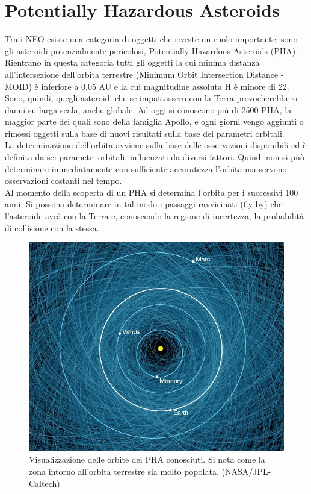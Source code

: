 \documentclass[a4paper,11pt,openright]{book}
\begin{document}
\section{Potentially Hazardous Asteroids}\label{sec:pha}
Tra i NEO esiste una categoria di oggetti che riveste un ruolo importante: sono gli asteroidi potenzialmente pericolosi, Potentially Hazardous Asteroids (PHA). Rientrano in questa categoria tutti gli oggetti la cui minima distanza all'intersezione dell'orbita terrestre (Minimum Orbit Intersection Distance - MOID) è inferiore a 0.05 AU e la cui magnitudine assoluta H è minore di 22. Sono, quindi, quegli asteroidi che se impattassero con la Terra provocherebbero danni su larga scala, anche globale. Ad oggi si conoscono più di 2500 PHA, la maggior parte dei quali sono della famiglia Apollo, e ogni giorni vengo aggiunti o rimossi oggetti sulla base di nuovi risultati sulla base dei parametri orbitali.\\
La determinazione dell'orbita avviene sulla base delle osservazioni disponibili ed è definita da sei parametri orbitali, influenzati da diversi fattori. Quindi non si può determinare immediatamente con sufficiente accuratezza l'orbita ma servono osservazioni costanti nel tempo.\\
Al momento della scoperta di un PHA si determina l'orbita per i successivi 100 anni. Si possono determinare in tal modo i passaggi ravvicinati (fly-by) che l'asteroide avrà con la Terra e, conoscendo la regione di incertezza, la probabilità di collisione con la stessa.

\begin{figure}
    \centering
    \includegraphics[scale=0.35]{figure/pha_map.jpg}
    \caption[Visualizzazione delle orbite dei PHA conosciuti.]{Visualizzazione delle orbite dei PHA conosciuti. Si nota come la zona intorno all'orbita terrestre sia molto popolata. (NASA/JPL-Caltech)}
    \label{fig:pha_map}
\end{figure}
\end{document}
